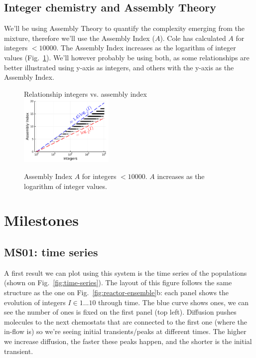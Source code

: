 \documentclass[11pt]{article}
\begin{document}
\subsection{Integer chemistry and Assembly Theory}
\label{subsec:integer-chemistry}

We’ll be using Assembly Theory to quantify the complexity emerging from the mixture, therefore we’ll use the Assembly Index ($A$). Cole has calculated $A$ for integers $<10000$. The Assembly Index increases as the logarithm of integer values (Fig.~\ref{fig:integers-assembly}). We’ll however probably be using both, as some relationships are better illustrated using y-axis as integers, and others with the y-axis as the Assembly Index.

\begin{figure}[hbt]
  \centering
  {\LARGE Relationship integers vs. assembly index}\vspace{1em}\\
  \includegraphics[width=0.40\textwidth]{figures/system/integers-assembly.pdf}
  \caption{Assembly Index $A$ for integers $<10000$. $A$ increases as the logarithm of integer values.}
  \label{fig:integers-assembly}
\end{figure}

\clearpage

\section{Milestones}
\label{sec:experiments}

\subsection{MS01: time series}
\label{subsec:MS01}

A first result we can plot using this system is the time series of the populations (shown on Fig.~\ref{fig:time-series}). The layout of this figure follows the same structure as the one on Fig.~\ref{fig:reactor-ensemble}b: each panel shows the evolution of integers $I\in{1...10}$ through time. The blue curve shows ones, we can see the number of ones is fixed on the first panel (top left). Diffusion pushes molecules to the next chemostats that are connected to the first one (where the in-flow is) so we’re seeing initial transients/peaks at different times. The higher we increase diffusion, the faster these peaks happen, and the shorter is the initial transient.
\end{document}
